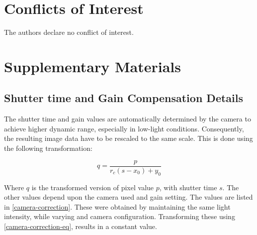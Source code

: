 \documentclass[10pt,authoryear,a4paper]{elsarticle}
\begin{document}
\section{Conflicts of Interest}
    
    The authors declare no conflict of interest.
    
    \FloatBarrier

\section{Supplementary Materials}

    \subsection{Shutter time and Gain Compensation Details}\label{st-gain-comp-details}
        
        The shutter time and gain values are automatically determined by the camera to achieve higher dynamic range, especially in low-light conditions. Consequently, the resulting image data have to be rescaled to the same scale. This is done using the following transformation:
        
        \begin{equation}
            q = \dfrac{p}{r_c (s - x_0) + y_0} \label{camera-correction-eq}
        \end{equation}
        
        Where $q$ is the transformed version of pixel value $p$, with shutter time $s$. The other values depend upon the camera used and gain setting. The values are listed in \cref{camera-correction}. These were obtained by maintaining the same light intensity, while varying and camera configuration. Transforming these using \cref{camera-correction-eq}, results in a constant value.
    
\end{document}
